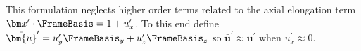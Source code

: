 This formulation neglects higher order terms related to the axial elongation term $\FramePosition' \cdot \FrameBasis = 1 + u_x^{\prime}$. 
To this end define $\bar{\bm{u}}^{\prime} = u_{\FrameYi}^{\prime} \FrameBasis_{\FrameYi} + u_{\FrameZi}^{\prime}\FrameBasis_{\FrameZi}$ so $\bar{\bm{u}}^{\prime} \approx \bm{u}^{\prime}$ when $u_x^{\prime} \approx 0$.
